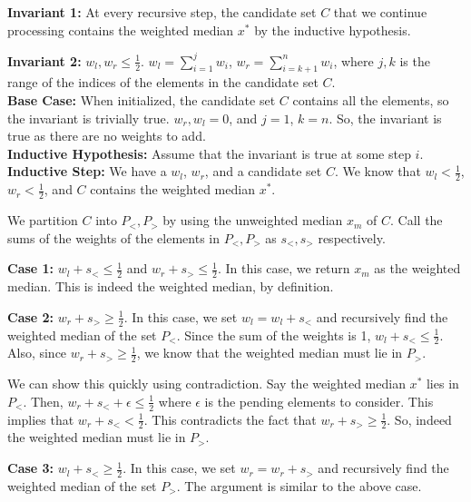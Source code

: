 \documentclass[a4paper]{article}
\begin{document}
\begin{enumerate}
    \textbf{Invariant 1:} At every recursive step, the candidate set $C$ that we continue
    processing contains the weighted median $x^{*}$ by the inductive hypothesis.

    \textbf{Invariant 2:} $w_l, w_r \leq \frac{1}{2}$. $w_l = \sum_{i=1}^{j}w_i$, $w_r = \sum_{i=k+1}^{n}w_i$, where $j, k$ is the range of the indices of the elements in the candidate set $C$.\\

    \textbf{Base Case:} When initialized, the candidate set $C$ contains all the elements, so the invariant is trivially true. $w_r, w_l = 0$, and $j = 1$, $k = n$. So, the invariant is true as there are no weights to add.\\

    \textbf{Inductive Hypothesis:} Assume that the invariant is true at some step $i$.\\

    \textbf{Inductive Step:} We have a $w_l$, $w_r$, and a candidate set $C$. We know that $w_l < \frac{1}{2}$, $w_r < \frac{1}{2}$, and $C$ contains the weighted median $x^{*}$.

    We partition $C$ into $P_{<}, P_{>}$ by using the unweighted median $x_m$ of $C$. Call the sums of the weights of the elements in $P_{<}, P_{>}$ as $s_{<}, s_{>}$ respectively.

   \textbf{Case 1:} $w_l + s_{<} \leq \frac{1}{2}$ and $w_r + s_{>} \leq \frac{1}{2}$. In this case, we return $x_m$ as the weighted median. This is indeed the weighted median, by definition.

   \textbf{Case 2:} $w_r + s_{>} \geq \frac{1}{2}$. In this case, we set $w_l = w_l + s_{<}$ and recursively find the weighted median of the set $P_{<}$. Since the sum of the weights is 1, $w_l + s_{<} \leq \frac{1}{2}$. Also, since $w_r + s_{>} \geq \frac{1}{2}$, we know that the weighted median must lie in $P_{>}$.

   We can show this quickly using contradiction. Say the weighted median $x^{*}$ lies in $P_{<}$. Then, $w_r + s_{<} + \epsilon \leq \frac{1}{2}$ where $\epsilon$ is the pending elements to consider. This implies that $w_r + s_{<} < \frac{1}{2}$. This contradicts the fact that $w_r + s_{>} \geq \frac{1}{2}$. So, indeed the weighted median must lie in $P_{>}$.

   \textbf{Case 3:} $w_l + s_{<} \geq \frac{1}{2}$. In this case, we set $w_r = w_r + s_{>}$ and recursively find the weighted median of the set $P_{>}$. The argument is similar to the above case.


\end{enumerate}
\end{document}
